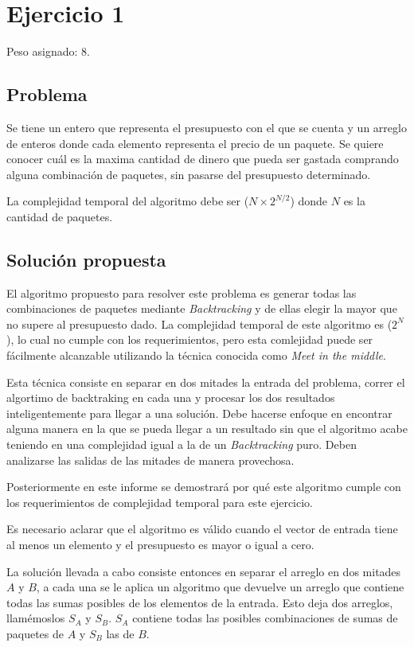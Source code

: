 \section{Ejercicio 1}

Peso asignado: 8.

\subsection{Problema}

Se tiene un entero que representa el presupuesto con el que se cuenta y un
arreglo de enteros donde cada elemento representa el precio de un paquete. Se
quiere conocer cuál es la maxima cantidad de dinero que pueda ser gastada
comprando alguna combinación de paquetes, sin pasarse del presupuesto
determinado.

La complejidad temporal del algoritmo debe ser \ord($N \times 2^{N / 2}$) donde
$N$ es la cantidad de paquetes.

\subsection{Solución propuesta}

El algoritmo propuesto para resolver este problema es generar todas las
combinaciones de paquetes mediante \textit{Backtracking} y de ellas elegir la
mayor que no supere al presupuesto dado. La complejidad temporal de este
algoritmo es \ord($2^N$), lo cual no cumple con los requerimientos, pero esta
comlejidad puede ser fácilmente alcanzable utilizando la técnica conocida como
\textit{Meet in the middle}.

Esta técnica consiste en separar en dos mitades la entrada del problema, correr
el algortimo de backtraking en cada una y procesar los dos resultados
inteligentemente para llegar a una solución. Debe hacerse enfoque en encontrar
alguna manera en la que se pueda llegar a un resultado sin que el algoritmo
acabe teniendo en una complejidad igual a la de un \textit{Backtracking} puro.
Deben analizarse las salidas de las mitades de manera provechosa.

Posteriormente en este informe se demostrará por qué este algoritmo cumple con
los requerimientos de complejidad temporal para este ejercicio.

Es necesario aclarar que el algoritmo es válido cuando el vector de entrada
tiene al menos un elemento y el presupuesto es mayor o igual a cero.

La solución llevada a cabo consiste entonces en separar el arreglo en dos
mitades $A$ y $B$, a cada una se le aplica un algoritmo que devuelve un arreglo
que contiene todas las sumas posibles de los elementos de la entrada. Esto deja
dos arreglos, llamémoslos $S_A$ y $S_B$. $S_A$ contiene todas las posibles
combinaciones de sumas de paquetes de $A$ y $S_B$ las de $B$.

